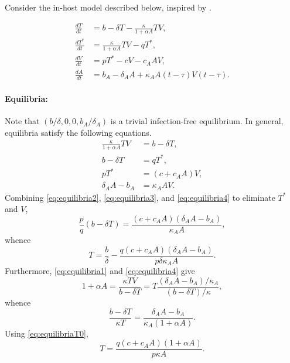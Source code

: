 \documentclass[11pt]{article}
\numberwithin{equation}{subsection}
\begin{document}
    Consider the in-host model described below, inspired by \cite{ciupe2017}.

    \begin{align}
        \frac{dT}{dt} &= b -  \delta T - \frac{\kappa}{1 + \alpha A} TV, \\
        \frac{dT^*}{dt} &= \frac{\kappa}{1 + \alpha A} TV - qT^*, \\
        \frac{dV}{dt} &= pT^* - cV - c_A AV, \\
        \frac{dA}{dt} &= b_A -  \delta_A A + \kappa_A A(t - \tau)V(t - \tau).
    \end{align}

    \paragraph{Equilibria:} Note that $(b / \delta, 0, 0, b_A / \delta_A)$ is
    a trivial infection-free equilibrium. In general, equilibria satisfy the
    following equations. \begin{align}
        \frac{\kappa}{1 + \alpha A} TV &= b - \delta T, \label{eq:equilibria1} \\
        b - \delta T &= q T^*, \label{eq:equilibria2} \\
        pT^* &= (c + c_A A)V, \label{eq:equilibria3} \\
        \delta_A A - b_A &= \kappa_A AV. \label{eq:equilibria4}
    \end{align}
    Combining \ref{eq:equilibria2}, \ref{eq:equilibria3}, and
    \ref{eq:equilibria4} to eliminate $T^*$ and $V$, \begin{equation}
        \frac{p}{q}(b - \delta T) = \frac{(c + c_A A)(\delta_A A - b_A)}{\kappa_A A},
            \label{eq:equilibriaT0}
    \end{equation}
    whence \begin{equation}
        T = \frac{b}{\delta} - \frac{q(c + c_A A)(\delta_A A - b_A)}{p \delta \kappa_A A}.
            \label{eq:equilibriaT1}
    \end{equation}
    Furthermore, \ref{eq:equilibria1} and \ref{eq:equilibria4} give \[
        1 + \alpha A = \frac{\kappa TV}{b - \delta T} = T \frac{(\delta_A A - b_A) / \kappa_A}{(b - \delta T) / \kappa},
    \] whence \[
        \frac{b - \delta T}{\kappa T} = \frac{\delta_A A - b_A}{\kappa_A (1 + \alpha A)}.
    \] Using \ref{eq:equilibriaT0}, \begin{equation}
        T  = \frac{q(c + c_A A)(1 + \alpha A)}{p\kappa A}.
            \label{eq:equilibriaT2}
    \end{equation}
\end{document}
